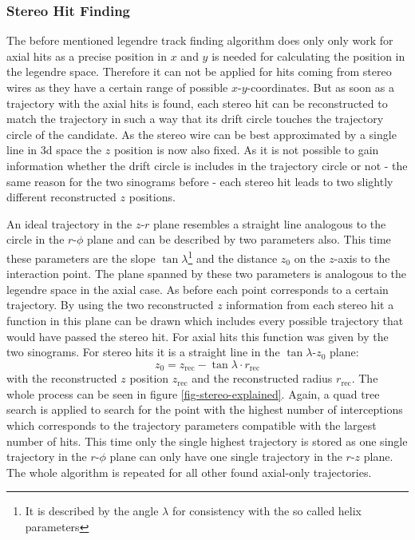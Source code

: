 \subsubsection{Stereo Hit Finding}

The before mentioned legendre track finding algorithm does only only work for axial hits as a precise position in $x$ and $y$ is needed for calculating the position in the legendre space. Therefore it can not be applied for hits coming from stereo wires as they have a certain range of possible $x$-$y$-coordinates. But as soon as a trajectory with the axial hits is found, each stereo hit can be reconstructed to match the trajectory in such a way that its drift circle touches the trajectory circle of the candidate. As the stereo wire can be best approximated by a single line in 3d space the $z$ position is now also fixed. As it is not possible to gain information whether the drift circle is includes in the trajectory circle or not - the same reason for the two sinograms before - each stereo hit leads to two slightly different reconstructed $z$ positions.

An ideal trajectory in the $z$-$r$ plane resembles a straight line analogous to the circle in the $r$-$\phi$ plane and can be described by two parameters also. This time these parameters are the slope $\tan \lambda$\footnote{It is described by the angle $\lambda$ for consistency with the so called helix parameters} and the distance $z_0$ on the $z$-axis to the interaction point. The plane spanned by these two parameters is analogous to the legendre space in the axial case. As before each point corresponds to a certain trajectory. By using the two reconstructed $z$ information from each stereo hit a function in this plane can be drawn which includes every possible trajectory that would have passed the stereo hit. For axial hits this function was given by the two sinograms. For stereo hits it is a straight line in the $\tan \lambda$-$z_0$ plane:
$$ z_0 = z_\text{rec} - \tan \lambda \cdot r_\text{rec} $$
with the reconstructed $z$ position $z_\text{rec}$ and the reconstructed radius $r_\text{rec}$. The whole process can be seen in figure \ref{fig-stereo-explained}. Again, a quad tree search is applied to search for the point with the highest number of interceptions which corresponds to the trajectory parameters compatible with the largest number of hits. This time only the single highest trajectory is stored as one single trajectory in the $r$-$\phi$ plane can only have one single trajectory in the $r$-$z$ plane. The whole algorithm is repeated for all other found axial-only trajectories. 

